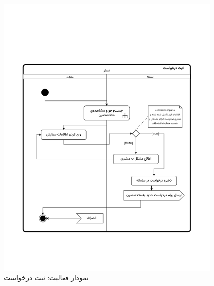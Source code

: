 \begin{figure}[ht!]
	\centering
	\includegraphics[scale=0.8, page=1]{figs/OOD-activity-submitreq.pdf}
	\caption{نمودار فعالیت: ثبت درخواست}
\end{figure}
\FloatBarrier
\newpage







